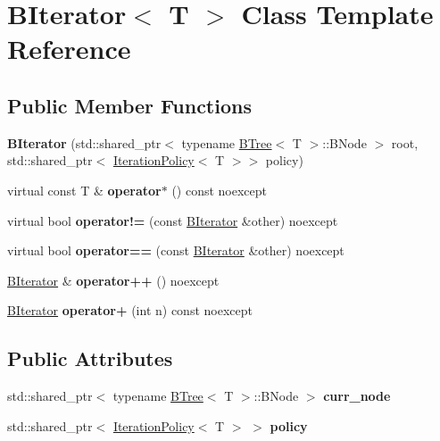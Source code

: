 \hypertarget{classBIterator}{}\section{B\+Iterator$<$ T $>$ Class Template Reference}
\label{classBIterator}
\subsection*{Public Member Functions}
\begin{DoxyCompactItemize}
\item 
\mbox{\label{classBIterator_a70e5ef674a148d7efcc6e2399c7ad337}} 
{\bfseries B\+Iterator} (std\+::shared\+\_\+ptr$<$ typename \hyperlink{classBTree}{B\+Tree}$<$ T $>$\+::B\+Node $>$ root, std\+::shared\+\_\+ptr$<$ \hyperlink{classIterationPolicy}{Iteration\+Policy}$<$ T $>$$>$ policy)
\item 
\mbox{\label{classBIterator_a2881a68f1b77b33fca0b10bc8f9b16bc}} 
virtual const T \& {\bfseries operator$\ast$} () const noexcept
\item 
\mbox{\label{classBIterator_a5b7417b24265f286d0e0086b7612f068}} 
virtual bool {\bfseries operator!=} (const \hyperlink{classBIterator}{B\+Iterator} \&other) noexcept
\item 
\mbox{\label{classBIterator_aafec736be0811d439943b0194dfb7db5}} 
virtual bool {\bfseries operator==} (const \hyperlink{classBIterator}{B\+Iterator} \&other) noexcept
\item 
\mbox{\label{classBIterator_a52a58da21d5eb11c0c84ffb8570b45d2}} 
\hyperlink{classBIterator}{B\+Iterator} \& {\bfseries operator++} () noexcept
\item 
\mbox{\label{classBIterator_a066f91cbacb2ef4de98f33dcb22c25c4}} 
\hyperlink{classBIterator}{B\+Iterator} {\bfseries operator+} (int n) const noexcept
\end{DoxyCompactItemize}
\subsection*{Public Attributes}
\begin{DoxyCompactItemize}
\item 
\mbox{\label{classBIterator_abee7e8944e9f35f81cc357be10e75b8c}} 
std\+::shared\+\_\+ptr$<$ typename \hyperlink{classBTree}{B\+Tree}$<$ T $>$\+::B\+Node $>$ {\bfseries curr\+\_\+node}
\item 
\mbox{\label{classBIterator_a7b6bb4f8550c6d2ee9549e15ab09a644}} 
std\+::shared\+\_\+ptr$<$ \hyperlink{classIterationPolicy}{Iteration\+Policy}$<$ T $>$ $>$ {\bfseries policy}
\end{DoxyCompactItemize}
